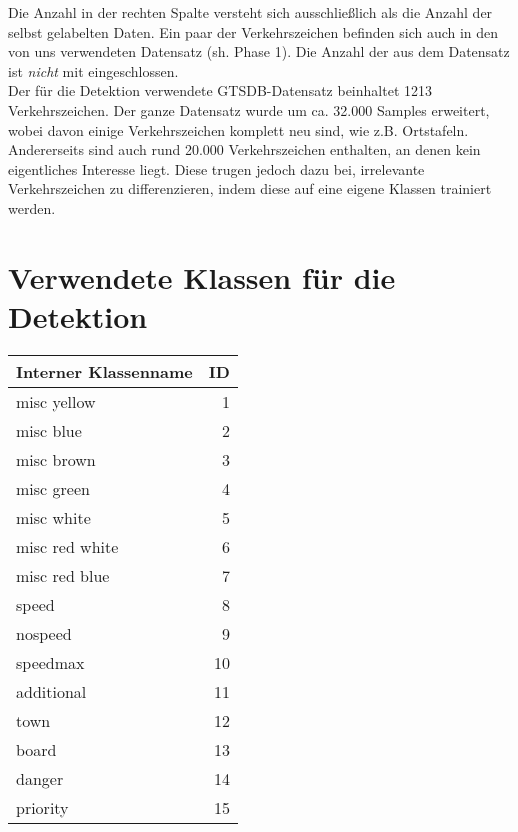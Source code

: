 \begin{appendix}
Die Anzahl in der rechten Spalte versteht sich ausschließlich als die Anzahl der selbst gelabelten Daten. Ein paar der Verkehrszeichen befinden sich auch in den von uns verwendeten Datensatz (sh. Phase 1). Die Anzahl der  aus dem Datensatz ist \textit{nicht} mit eingeschlossen.\\

Der für die \gls{Detektion} verwendete GTSDB-Datensatz beinhaltet 1213 Verkehrszeichen. Der ganze Datensatz wurde um ca. 32.000 \gls{Sample}s erweitert, wobei davon einige Verkehrszeichen komplett neu sind, wie z.B. Ortstafeln. Andererseits sind auch rund 20.000 Verkehrszeichen enthalten, an denen kein eigentliches Interesse liegt. Diese trugen jedoch dazu bei, irrelevante Verkehrszeichen zu differenzieren, indem diese auf eine eigene Klassen trainiert werden.
\newpage
\section{Verwendete Klassen für die Detektion}
\label{sec:klassen_detektion}
\begin{longtabu}{|l|r|}
\hline
Interner Klassenname & ID \\
\hline
misc yellow & 1\\
\hline
misc blue & 2\\
\hline
misc brown & 3\\
\hline
misc green & 4\\
\hline
misc white & 5\\
\hline
misc red white & 6\\
\hline
misc red blue& 7\\
\hline
speed& 8\\
\hline
nospeed& 9\\
\hline
speedmax& 10\\
\hline
additional& 11\\
\hline
town& 12\\
\hline
board& 13\\
\hline
danger& 14\\
\hline
priority& 15\\
\hline
\end{longtabu}
\pagebreak

\printnoidxglossary[type=\acronymtype,numberedsection=autolabel] 

\end{appendix}